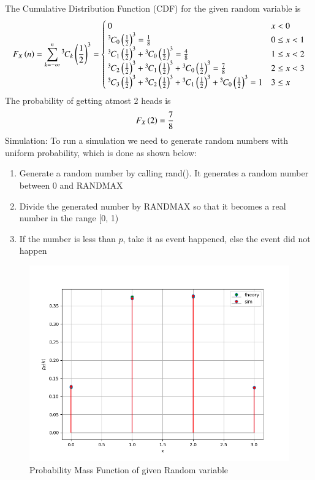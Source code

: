 \documentclass[journal]{IEEEtran}
\begin{document}
The Cumulative Distribution Function (CDF) for the given random variable is
\begin{align}
  F_{X}\left(n\right) = \sum_{k = -\infty}^n{{}^{3}\mkern-1muC_{k}}\left(\frac{1}{2}\right)^3 = \begin{cases}
    0 & x < 0\\
    {{}^{3}\mkern-1muC_{0}}\left(\frac{1}{2}\right)^3 = \frac{1}{8} & 0 \le x < 1\\
    {{}^{3}\mkern-1muC_{1}}\left(\frac{1}{2}\right)^3 + {{}^{3}\mkern-1muC_{0}}\left(\frac{1}{2}\right)^3 = \frac{4}{8}& 1 \le x < 2\\
    {{}^{3}\mkern-1muC_{2}}\left(\frac{1}{2}\right)^3 + {{}^{3}\mkern-1muC_{1}}\left(\frac{1}{2}\right)^3 + {{}^{3}\mkern-1muC_{0}}\left(\frac{1}{2}\right)^3 = \frac{7}{8} & 2 \le x < 3\\
    {{}^{3}\mkern-1muC_{3}}\left(\frac{1}{2}\right)^3 + {{}^{3}\mkern-1muC_{2}}\left(\frac{1}{2}\right)^3 + {{}^{3}\mkern-1muC_{1}}\left(\frac{1}{2}\right)^3 + {{}^{3}\mkern-1muC_{0}}\left(\frac{1}{2}\right)^3= 1 & 3 \le x\\
  \end{cases}
\end{align}
The probability of getting atmost 2 heads is
\begin{align}
  F_X\left(2\right) &= \frac{7}{8}
\end{align}
Simulation:
\newline
To run a simulation we need to generate random numbers with uniform probability, which is done
as shown below:
\begin{enumerate}
  \item Generate a random number by calling rand(). It generates a random number between 0 and RANDMAX
  \item Divide the generated number by RANDMAX so that it becomes a real number in the range [0, 1)
  \item If the number is less than $p$, take it as event happened, else the event did not happen
\end{enumerate}
\begin{figure}[h!]
   \centering
   \includegraphics[width=1\columnwidth]{figs/pmf.png}
    \caption{Probability Mass Function of given Random variable}
\end{figure}
\end{document}
